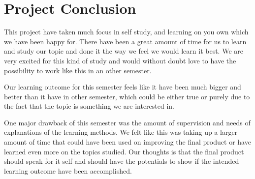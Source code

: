 \section{Project Conclusion}

This project have taken much focus in self study, and learning on you own which we have been happy for. There have been a great amount of time for us to learn and study our topic and done it the way we feel we would learn it best. We are very excited for this kind of study and would without doubt love to have the possibility to work like this in an other semester.

Our learning outcome for this semester feels like it have been much bigger and better than it have in other semester, which could be either true or purely due to the fact that the topic is something we are interested in.

One major drawback of this semester was the amount of supervision and needs of explanations of the learning methods. We felt like this was taking up a larger amount of time that could have been used on improving the final product or have learned even more on the topics studied. Our thoughts is that the final product should speak for it self and should have the potentials to show if the intended learning outcome have been accomplished.